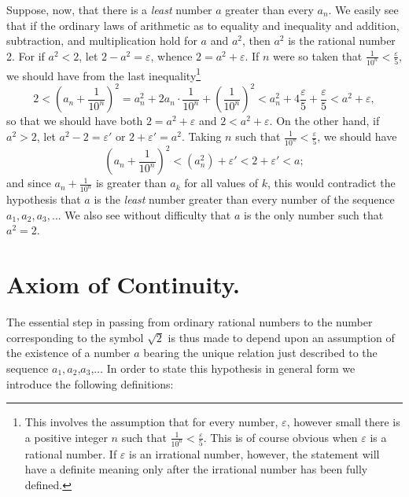 \documentclass[a4paper,12pt]{book}[2004/02/16]
\providecommand{\colorbox}[2]{#2}
\newcommand{\correction}[2]{\colorbox{corr}{#1}}
\providecommand{\hypertarget}[2]{#2}
\theoremstyle{ilemma}
\theoremstyle{itheorem}
\theoremstyle{iother}
\theoremstyle{icorollary}
\theoremstyle{numcorollary}
\theoremstyle{idefinition}
\begin{document}
Suppose, now, that there is a \emph{least} number $a$ greater than
every $a_n$. We easily see that if the ordinary laws of arithmetic as
to equality and inequality and addition, subtraction, and
multiplication hold for $a$ and $a^2$, then $a^2$ is the rational
number 2. For if $a^2<2$, let $2-a^2 = \varepsilon$, whence $2=a^2 +
\varepsilon$. If $n$ were so taken that $\frac{1}{10^n} <
\frac\varepsilon5$, we should have from the last inequality\footnote{%
    This involves the assumption that for every number,
    $\varepsilon$, however small there is a positive
    \correction{integer}{integrer} $n$ such that $\frac{1}{10^n} <
    \frac\varepsilon5$. This is of course obvious when
    $\varepsilon$ is a rational number. If $\varepsilon$ is an
    irrational number, however, the statement will have a definite
    meaning only after the irrational number has been fully
    defined.}
\[
  2< \left(a_n + \frac{1}{10^n}\right)^2 = a_n^2 +
  2a_n\cdot\frac{1}{10^n}+
  \left(\frac{1}{10^n}\right)^2 < a_n^2 + 4\frac\varepsilon5 +
  \frac\varepsilon5 < a^2 + \varepsilon,
\]
so that we should have both $2=a^2 + \varepsilon$ and
$2<a^2+\varepsilon$. On the
other hand, if $a^2 > 2$, let $a^2-2 = \varepsilon'$ or $2 +
\varepsilon' = a^2$. Taking $n$ such that $\frac{1}{10^n} <
\frac\varepsilon5$, we should have
\[
  \left(a_n +\frac{1}{10^n} \right)^2 < (a_n^2) +\varepsilon'
  < 2+\varepsilon' < a;
\]
and since $a_n + \frac{1}{10^n}$ is greater than $a_k$ for all values
of $k$, this would contradict the hypothesis that $a$ is the
\emph{least} number greater than every number of the sequence
$a_1,a_2,a_3,\ldots$ We also see without difficulty that $a$ is the
only number such that $a^2 =2$.

\section{Axiom of Continuity.}\hypertarget{chIsec2}{}%

The essential step in passing from ordinary rational numbers
to the number corresponding to the symbol $\sqrt{2}$ is thus
made to depend upon an assumption of the existence of a
number $a$ bearing the unique relation just described to the
sequence $a_1,a_2$,\correction{$a_3$}{$a_n$},$\ldots$
In order to state this hypothesis in
general form we introduce the following definitions:
\end{document}
